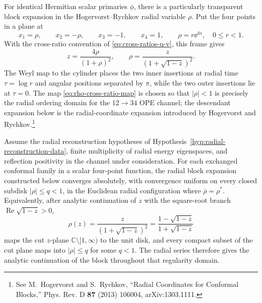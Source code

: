 For identical Hermitian scalar primaries \(\phi\), there is a particularly
transparent block expansion in the Hogervorst--Rychkov radial variable
\(\rho\).  Put the four points in a plane at
\[
  x_1=\rho,\qquad x_2=-\rho,\qquad x_3=-1,\qquad x_4=1,
  \qquad
  \rho=r\ee^{\ii\alpha},\quad 0\le r<1.
\]
With the cross-ratio convention of
\eqref{eq:cross-ratios-u-v}, this frame gives
\begin{equation}
  z=\frac{4\rho}{(1+\rho)^2},
  \qquad
  \rho=\frac{z}{(1+\sqrt{1-z})^2}.
  \label{eq:rho-cross-ratio-map}
\end{equation}
The Weyl map to the cylinder places the two inner insertions at radial time
\(\tau=\log r\) and angular positions separated by \(\pi\), while the two
outer insertions lie at \(\tau=0\).  The map
\eqref{eq:rho-cross-ratio-map} is chosen so that \(|\rho|<1\) is precisely the
radial ordering domain for the \(12\to34\) OPE channel; the descendant expansion
below is the radial-coordinate expansion introduced by Hogervorst and
Rychkov.\footnote{See M.~Hogervorst and S.~Rychkov, ``Radial Coordinates for
Conformal Blocks,'' Phys. Rev. D \textbf{87} (2013) 106004,
arXiv:1303.1111.}

\begin{theorem}
\label{thm:hogervorst-rychkov-rho-convergence}
Assume the radial reconstruction hypotheses of
Hypothesis~\ref{hyp:radial-reconstruction-data}, finite multiplicity of radial
energy eigenspaces, and reflection positivity in the channel under
consideration.  For each exchanged conformal family in a scalar four-point
function, the radial block expansion constructed below converges absolutely,
with convergence uniform on every closed subdisk \(|\rho|\le q<1\), in the
Euclidean radial configuration where \(\bar\rho=\rho^*\).  Equivalently, after
analytic continuation of \(z\) with the square-root branch
\(\operatorname{Re}\sqrt{1-z}>0\),
\[
  \rho(z)
  =
  \frac{z}{(1+\sqrt{1-z})^2}
  =
  \frac{1-\sqrt{1-z}}{1+\sqrt{1-z}}
\]
maps the cut \(z\)-plane \(\mathbb C\setminus[1,\infty)\) to the unit disk,
and every compact subset of the cut plane maps into \(|\rho|\le q\) for some
\(q<1\).  The radial series therefore gives the analytic continuation of the
block throughout that regularity domain.
\end{theorem}

